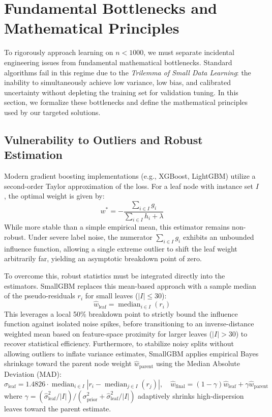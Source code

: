 \documentclass{article}
\begin{document}
\section{Fundamental Bottlenecks and Mathematical Principles}
\label{sec:theory}

To rigorously approach learning on $n < 1000$, we must separate incidental engineering issues from fundamental mathematical bottlenecks. Standard algorithms fail in this regime due to the \textit{Trilemma of Small Data Learning}: the inability to simultaneously achieve low variance, low bias, and calibrated uncertainty without depleting the training set for validation tuning. In this section, we formalize these bottlenecks and define the mathematical principles used by our targeted solutions.

\subsection{Vulnerability to Outliers and Robust Estimation}
Modern gradient boosting implementations (e.g., XGBoost, LightGBM) utilize a second-order Taylor approximation of the loss. For a leaf node with instance set $I$, the optimal weight is given by:
\begin{equation}
\label{eq:taylor_leaf}
w^* = -\frac{\sum_{i \in I} g_i}{\sum_{i \in I} h_i + \lambda}
\end{equation}
While more stable than a simple empirical mean, this estimator remains non-robust. Under severe label noise, the numerator $\sum_{i \in I} g_i$ exhibits an unbounded influence function, allowing a single extreme outlier to shift the leaf weight arbitrarily far, yielding an asymptotic breakdown point of zero.

To overcome this, robust statistics must be integrated directly into the estimators. SmallGBM replaces this mean-based approach with a sample median of the pseudo-residuals $r_i$ for small leaves ($|I| \le 30$):
\begin{equation}
\label{eq:median_leaf}
\hat{w}_{\text{leaf}} = \operatorname{median}_{i \in I}(r_i)
\end{equation}
This leverages a local 50\% breakdown point to strictly bound the influence function against isolated noise spikes, before transitioning to an inverse-distance weighted mean based on feature-space proximity for larger leaves ($|I| > 30$) to recover statistical efficiency. Furthermore, to stabilize noisy splits without allowing outliers to inflate variance estimates, SmallGBM applies empirical Bayes shrinkage toward the parent node weight $\hat{w}_{\text{parent}}$ using the Median Absolute Deviation (MAD):
\begin{equation}
\label{eq:mad_shrinkage}
\hat{\sigma}_{\text{leaf}} = 1.4826 \cdot \operatorname{median}_{i \in I} \left| r_i - \operatorname{median}_{j \in I}(r_j) \right|, \quad \hat{w}_{\text{final}} = (1 - \gamma)\hat{w}_{\text{leaf}} + \gamma \hat{w}_{\text{parent}}
\end{equation}
where $\gamma = (\hat{\sigma}_{\text{leaf}}^2 / |I|) / (\sigma_{\text{prior}}^2 + \hat{\sigma}_{\text{leaf}}^2 / |I|)$ adaptively shrinks high-dispersion leaves toward the parent estimate.
\end{document}
